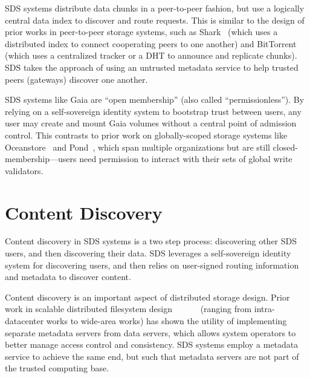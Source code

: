 
SDS systems distribute data chunks in a peer-to-peer fashion, but use
a logically central data index to discover and route requests.  This is similar
to the design of prior works in peer-to-peer storage systems, such as
Shark~\cite{shark} (which uses a distributed index to connect cooperating
peers to one another) and BitTorrent~\cite{bittorrent} (which uses a centralized
tracker or a DHT to announce and replicate chunks).  SDS takes the approach of
using an untrusted metadata service to help trusted peers (gateways) discover
one another.

SDS systems like Gaia are ``open membership'' (also called ``permissionless'').
By relying on a self-sovereign identity system to bootstrap trust between users,
any user may create and mount Gaia volumes without a central point of admission
control.  This contrasts to prior work on globally-scoped storage systems like
Oceanstore~\cite{oceanstore} and Pond~\cite{pond}, which span multiple
organizations but are still closed-membership---users need permission to interact with their sets of global
write validators.

\section{Content Discovery}


Content discovery in SDS systems is a two step process:  discovering other
SDS users, and then discovering their data.  SDS leverages a self-sovereign
identity system for discovering users, and then relies on user-signed routing
information and metadata to discover content.

Content discovery is an important aspect of distributed storage design.  Prior
work in scalable distributed filesystem
design~\cite{berkeley-xFS}~\cite{farsight}~\cite{zebra}~\cite{spritefs}~\cite{glusterfs}~\cite{lustre}
(ranging from intra-datacenter works to wide-area works)
has shown the utility of implementing separate metadata servers from data
servers, which allows system operators to better manage access control and
consistency.  SDS systems employ a metadata service to achieve the same end, but
such that metadata servers are not part of the trusted computing base.

